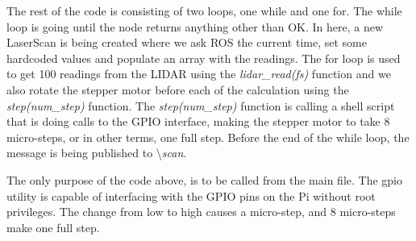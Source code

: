 The rest of the code is consisting of two loops, one while and one for. The while loop is going until the node returns anything other than OK. In here, a new LaserScan is being created where we ask ROS the current time, set some hardcoded values and populate an array with the readings. The for loop is used to get 100 readings from the LIDAR using the \textit{lidar\_read(fs)} function and we also rotate the stepper motor before each of the calculation using the \textit{step(num\_step)} function. The \textit{step(num\_step)} function is calling a shell script that is doing calls to the GPIO interface, making the stepper motor to take 8 micro-steps, or in other terms, one full step. Before the end of the while loop, the message is being published to \textbackslash\textit{scan}.



The only purpose of the code above, is to be called from the main file. The gpio utility is capable of interfacing with the GPIO pins on the Pi without root privileges. The change from low to high causes a micro-step, and 8 micro-steps make one full step.
